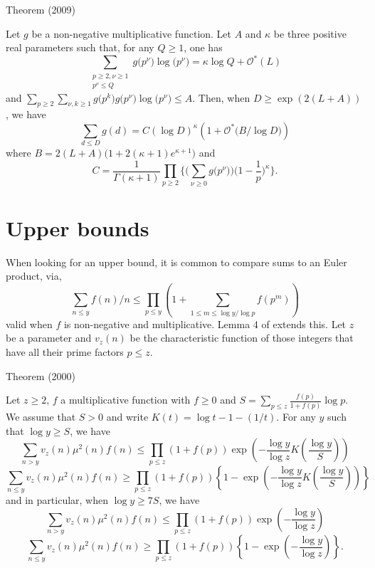 \par 
\begin{thm}{Theorem (2009)}

Let $g$ be a non-negative multiplicative function.
Let $A$ and $\kappa$ be three positive real parameters such that, for any
$Q\ge1$, one has
$$
\sum_{\substack{ p\ge2, \nu\ge1\\  p^{\nu}\le Q}}
g\bigl(p^{\nu}\bigr)\log\bigl(p^{\nu}\bigr)
=
\kappa\log Q+\mathcal{O}^*(L)
$$
and
$
\sum_{p\ge2}
\sum_{\nu,k\ge1}g\bigl(p^k\bigr)g\bigl(p^{\nu}\bigr)\log\bigl(p^{\nu}\bigr)
\le A.
$
Then, when $D\ge\exp(2(L+A))$, we have
$$
\sum_{d\le D}g(d)= C\left(\log D\right)^{\kappa}
\left(1+\mathcal{O}^*\bigl(B/\log D\bigr)\right)
$$
where $B=2(L+A)\bigl(1+2(\kappa+1)e^{\kappa+1}\bigr)$ and
$$
C=\frac{1}{\Gamma(\kappa+1)}
\prod_{p\ge2}\biggl\{
\biggl(\sum_{\nu\ge0}g\bigl(p^{\nu}\bigr)\biggr)
\biggl(1-\frac1p\biggr)^{\kappa}\biggr\}.
$$
\end{thm}



\section{Upper bounds}


When looking for an upper bound, it is common to compare sums to an Euler
product, via, 
$$
\sum_{n\le y}f(n)/n\le \prod_{p\le y}
\left(1+\sum_{1\le m\le \log y/\log p}f(p^m)\right)
$$
valid when $f$ is non-negative and multiplicative.
Lemma 4 of
\cite{Daboussi-Rivat*01}
extends this. Let $z$ be a parameter and $v_z(n)$ be the characteristic
function of those integers that have all their prime factors $p\le z$.

\begin{thm}{Theorem (2000)}

Let $z\ge2$, $f$ a multiplicative function with $f\ge0$ and 
$S=\sum_{p\le z}\frac{f(p)}{1+f(p)}\log p$. We assume that $S>0$ and write
$K(t)=\log t-1-(1/t)$. For any $y$ such that $\log y\ge S$, we have
$$
\sum_{n > y}v_z(n)\mu^2(n)f(n)
\le \prod_{p\le z}(1+f(p))\exp\left(-\frac{\log y}{\log z}
K\left(\frac{\log y}{S}\right)\right)
$$
$$
\sum_{n \le y}v_z(n)\mu^2(n)f(n)
\ge \prod_{p\le z}(1+f(p))\left\{1-\exp\left(-\frac{\log y}{\log z}
K\left(\frac{\log y}{S}\right)\right)\right\}
$$
and in particular, when $\log y\ge 7S$, we have
$$
\sum_{n > y}v_z(n)\mu^2(n)f(n)
\le \prod_{p\le z}(1+f(p))\exp\left(-\frac{\log y}{\log z}\right)
$$
$$
\sum_{n \le y}v_z(n)\mu^2(n)f(n)
\ge \prod_{p\le z}(1+f(p))\left\{1-\exp\left(-\frac{\log y}{\log z}\right)\right\}.
$$
\end{thm}


